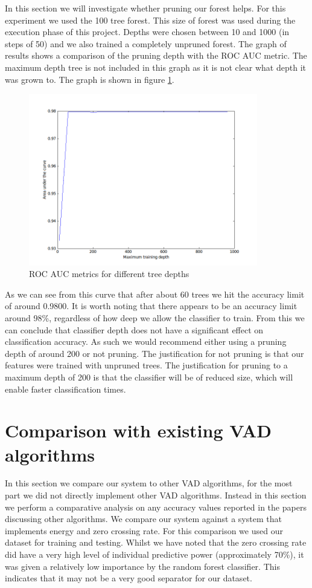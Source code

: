 \documentclass[ %
                    author={Sam Phippen},
                supervisor={Dr. Rafal Bogacz},
                     title={Real time voice activity detectors in noisy personal computing environments},
                  subtitle={},
                    degree={MEng},
                      year={2012} ]{thesis}
\begin{document}
In this section we will investigate whether pruning our forest helps. For this
experiment we used the 100 tree forest. This size of forest was used during the
execution phase of this project. Depths were chosen between 10 and 1000 (in
steps of 50) and we also trained a completely unpruned forest. The graph of
results shows a comparison of the pruning depth with the ROC AUC metric. The
maximum depth tree is not included in this graph as it is not clear what depth
it was grown to.  The graph is shown in figure \ref{fig:roc-depths}.

\begin{figure}
    \includegraphics[width=10cm]{roc_differing_depth.png}

    \caption{ROC AUC metrics for different tree depths}
    \label{fig:roc-depths}
\end{figure}

As we can see from this curve that after about 60 trees we hit the accuracy
limit of around 0.9800. It is worth noting that there appears to be an accuracy
limit around 98\%, regardless of how deep we allow the classifier to train.
From this we can conclude that classifier depth does not have a significant
effect on classification accuracy. As such we would recommend either using a
pruning depth of around 200 or not pruning. The justification for not pruning
is that our features were trained with unpruned trees. The justification for
pruning to a maximum depth of 200 is that the classifier will be of reduced
size, which will enable faster classification times.

\section{Comparison with existing VAD algorithms}

In this section we compare our system to other VAD algorithms, for the most
part we did not directly implement other VAD algorithms. Instead in this
section we perform a comparative analysis on any accuracy values reported in
the papers discussing other algorithms. We compare our system against a system
that implements energy and zero crossing rate. For this comparison we used our
dataset for training and testing. Whilst we have noted that the zero crossing
rate did have a very high level of individual predictive power (approximately
70\%), it was given a relatively low importance by the random forest
classifier.  This indicates that it may not be a very good separator for our
dataset.
\end{document}

